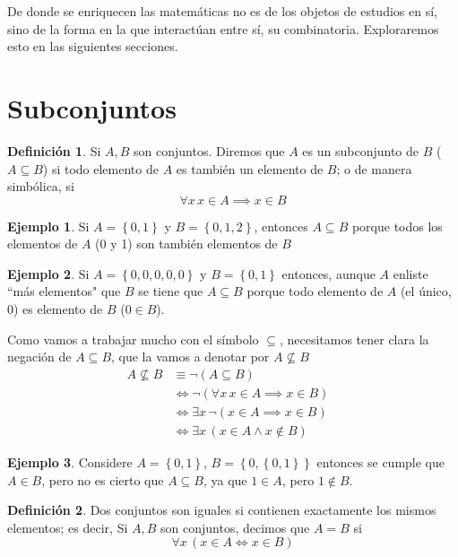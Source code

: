 \documentclass{book}
\newcommand{\set}[1]{\left\lbrace #1 \right\rbrace }
\theoremstyle{definition}
\newtheorem{df}{Definición}[chapter]
\newtheorem{ejm}{Ejemplo}[chapter]
\begin{document}
De donde se enriquecen las matemáticas no es de los objetos de estudios en sí, sino de la forma en la que interactúan entre sí, su combinatoria.
Exploraremos esto en las siguientes secciones.
\section{Subconjuntos}
\begin{df}
	Si $A,B$ son conjuntos. Diremos que $A$ es un subconjunto de $B$ ($A\subseteq B$) si todo elemento de $A$ es también un elemento de $B$; o de manera simbólica, si
	\[\forall x\, x\in A \implies x \in B \]
\end{df}

\begin{ejm}
	Si $A=\set{0,1}$ y $B=\set{0,1,2}$, entonces $A\subseteq B$ porque todos los elementos de $A$ (0 y 1) son también elementos de $B$
\end{ejm}

\begin{ejm}
	Si $A=\set{0,0,0,0,0}$ y $B=\set{0,1}$ entonces, aunque $A$ enliste ``más elementos" que $B$ se tiene que $A\subseteq B$ porque todo elemento de $A$ (el único, $0$) es elemento de $B$ ($0 \in B$). 
\end{ejm}

Como vamos a trabajar mucho con el símbolo $\subseteq$, necesitamos tener clara la negación de $A\subseteq B$, que la vamos a denotar por $A \not \subseteq B$
\begin{align*}
	A \not \subseteq B &\equiv \neg (A \subseteq B) & \\
	&\iff \neg (\forall x\, x \in A \implies x \in B)\\
	&\iff \exists x\, \neg (x \in A \implies x \in B)\\
	&\iff \exists x\, \left( x\in A \wedge x \notin B \right)
\end{align*}

\begin{ejm}
	Considere $A = \set{0,1}$, $B=\set{0,\set{0,1}}$ entonces se cumple que $A\in B$, pero no es cierto que $A\subseteq B$, ya que $1\in A$, pero $1 \notin B$.
\end{ejm}

\begin{df}
	Dos conjuntos son iguales si contienen exactamente los mismos elementos; es decir,
	Si $A,B$ son conjuntos, decimos que $A=B$ si \[\forall x \, \left(x\in A \iff x \in B \right) \]
\end{df}
\end{document}
